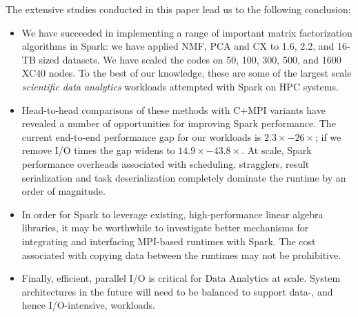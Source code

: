 The extensive studies conducted in this paper lead us to the following conclusion: 
\begin{itemize}
\item{We have succeeded in implementing a range of important matrix factorization algorithms in Spark: we have applied NMF, PCA and CX to 1.6, 2.2, and 16-TB sized datasets. We have scaled the codes on 50, 100, 300, 500, and 1600 XC40 nodes. To the best of our knowledge, these are some of the largest scale \emph{scientific data analytics} workloads attempted with Spark on HPC systems.}
\item{Head-to-head comparisons of these methods with C+MPI variants have revealed a number of opportunities for improving Spark performance. The current end-to-end performance gap for our workloads is $2.3\times - 26\times$; if we remove I/O times the gap widens to $14.9\times - 43.8\times$. At scale, Spark performance overheads associated with scheduling, stragglers, result serialization and task deserialization completely dominate the runtime by an order of magnitude.}
\item{In order for Spark to leverage existing, high-performance linear algebra libraries, it may be worthwhile to investigate better mechanisms for integrating and interfacing MPI-based runtimes with Spark. The cost associated with copying data between the runtimes may not be prohibitive.}
\item{Finally, efficient, parallel I/O is critical for Data Analytics at scale. System architectures in the future will need to be balanced to support data-, and hence I/O-intensive, workloads.}
\end{itemize}